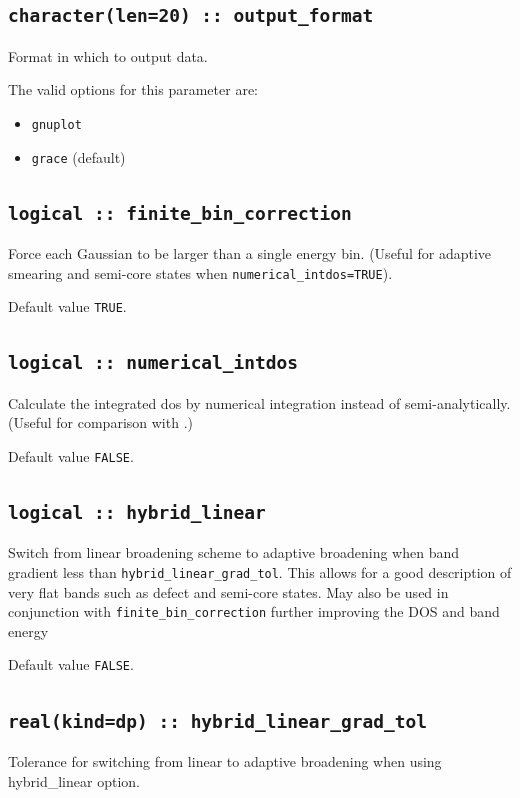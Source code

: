 \documentclass[a4paper,11pt,twoside]{book}
\begin{document}
{\subsection[output\_format]{\tt character(len=20) :: output\_format}
Format in which to output data.

The valid options for this parameter are:
\begin{itemize}
\item[{\bf --}]  \verb#gnuplot#
\item[{\bf --}]  \verb#grace# (default)
\end{itemize}

\subsection[finite\_bin\_correction]{\tt logical :: finite\_bin\_correction}
Force each Gaussian to be larger than a single energy bin. (Useful for adaptive smearing and semi-core states when \verb#numerical_intdos=TRUE#).

Default value \verb#TRUE#.

\subsection[numerical\_intdos]{\tt logical :: numerical\_intdos}
Calculate the integrated dos by numerical integration instead of semi-analytically. (Useful for comparison with \lindos.)

Default value \verb#FALSE#.

\subsection[hybrid\_linear]{\tt logical :: hybrid\_linear}
Switch from linear broadening scheme to adaptive broadening when band gradient less than \verb#hybrid_linear_grad_tol#.
This allows for a good description of very flat bands such as defect and semi-core states. May also be used in conjunction
with \verb#finite_bin_correction# further improving the DOS and band energy

Default value \verb#FALSE#.

\subsection[hybrid\_linear\_grad\_tol]{\tt real(kind=dp) :: hybrid\_linear\_grad\_tol}
Tolerance for switching from linear to adaptive broadening when using hybrid\_linear option.

}
\end{document}
